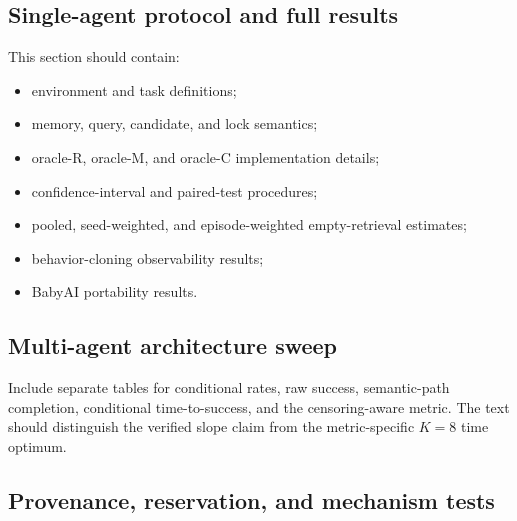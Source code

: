 \documentclass[letterpaper]{article}
\begin{document}
\subsection{Single-agent protocol and full results}


This section should contain:
\begin{itemize}
    \item environment and task definitions;
    \item memory, query, candidate, and lock semantics;
    \item oracle-R, oracle-M, and oracle-C implementation details;
    \item confidence-interval and paired-test procedures;
    \item pooled, seed-weighted, and episode-weighted empty-retrieval estimates;
    \item behavior-cloning observability results;
    \item BabyAI portability results.
\end{itemize}

\subsection{Multi-agent architecture sweep}


Include separate tables for conditional rates, raw success, semantic-path completion, conditional time-to-success, and the censoring-aware metric. The text should distinguish the verified slope claim from the metric-specific $K=8$ time optimum.

\subsection{Provenance, reservation, and mechanism tests}

\end{document}
